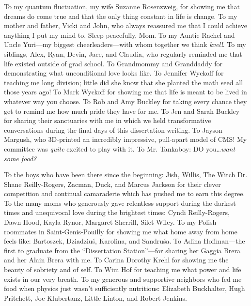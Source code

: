 To my quantum fluctuation, my wife Suzanne Rosenzweig, for showing me that dreams do come true and that the only thing constant in life is change.
To my mother and father, Vicki and John, who always reassured me that I could achieve anything I put my mind to. Sleep peacefully, Mom.
To my Auntie Rachel and Uncle Yuri---my biggest cheerleaders---with whom together we think \emph{kvell}.
To my siblings, Alex, Ryan, Devin, Jace, and Claudia, who regularly reminded me that life existed outside of grad school.
To Grandmommy and Granddaddy for demonstrating what unconditional love looks like.
To Jennifer Wyckoff for teaching me long division; little did she know that she planted the math seed all those years ago!
To Mark Wyckoff for showing me that life is meant to be lived in whatever way you choose.
To Rob and Amy Buckley for taking every chance they get to remind me how much pride they have for me.
To Jen and Sarah Buckley for sharing their sanctuaries with me in which we held transformative conversations during the final days of this dissertation writing.
To Jayson Margush, who 3D-printed an incredibly impressive, pull-apart model of CMS! My committee was \emph{quite} excited to play with it.
To Mr. Tankaboy: DO you\ldots \emph{want some food?}

To the boys who have been there since the beginning: Jish, Willis, The Witch Dr. Shane Reilly-Rogers, Zacman, Duck, and Marcus Jackson for their clever competition and continual camaraderie which has pushed me to earn this degree.
To the many moms who generously gave relentless support during the darkest times and unequivocal love during the brightest times:
Cyndi Reilly-Rogers, Dawn Hood, Kayla Rynor, Margaret Sherrill, Silet Wiley.
To my Polish roommates in Saint-Genis-Pouilly for showing me what home away from home feels like: Bartoszek, Dziadziuś, Karolina, and Sandruśa.
To Adina Hoffman---the first to graduate from the ``Dissertation Station''---for sharing her Gaggia Brera and her Alain Brera with me.
To Carina Dorothy Krehl for showing me the beauty of sobriety and of self.
To Wim Hof for teaching me what power and life exists in our very breath.
To my generous and supportive neighbors who fed me food when physics just wasn't sufficiently nutritious: Elizabeth Buckhalter, Hugh Pritchett, Joe Klubertanz, Little Linton, and Robert Jenkins.

